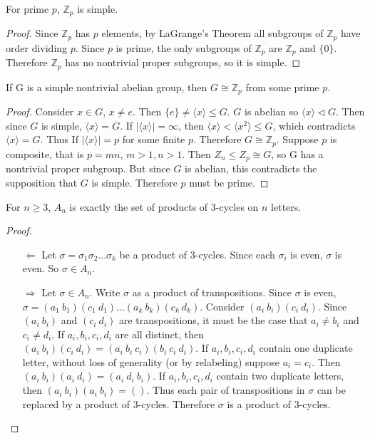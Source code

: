 \documentclass[a4paper]{article}
\begin{document}
\begin{theorem}For prime $p$, $\mathbb{Z}_p$ is simple.
\end{theorem}
\begin{proof}
Since $\mathbb{Z}_p$ has $p$ elements, by LaGrange's Theorem all subgroups of $\mathbb{Z}_p$ have order dividing $p$. Since $p$ is prime, the only subgroups of $\mathbb{Z}_p$ are $\mathbb{Z}_p$ and $\{0\}$. Therefore $\mathbb{Z}_p$ has no nontrivial proper subgroups, so it is simple.
\end{proof}

\begin{theorem}
If G is a simple nontrivial abelian group, then $G \cong \mathbb{Z}_p$ from some prime $p$.
\end{theorem}
\begin{proof}
Consider $x \in G$, $x \neq e$. Then $\{ e \} \neq \langle x \rangle \le G$. $G$ is abelian so $\langle x \rangle \triangleleft G$. Then since $G$ is simple, $\langle x \rangle = G$. If $|\langle x \rangle| = \infty$, then $\langle x \rangle < \langle x^2 \rangle \leq G$, which contradicts $\langle x \rangle = G$. Thus If $|\langle x \rangle| = p$ for some finite $p$. Therefore $G \cong \mathbb{Z}_p$. Suppose $p$ is composite, that is $p = m n$, $m > 1, n > 1$. Then $Z_n \leq Z_p \cong G$, so G has a nontrivial proper subgroup. But since $G$ is abelian, this contradicts the supposition that $G$ is simple. Therefore $p$ must be prime.
\end{proof}

\begin{theorem}
\label{generatethm}
For $n \ge 3$, $A_n$ is exactly the set of products of 3-cycles on $n$ letters.
\end{theorem}
\begin{proof}~
\begin{enumerate}
\item[$\Leftarrow$]
Let $\sigma = \sigma_1 \sigma_2 ... \sigma_k$ be a product of 3-cycles. Since each $\sigma_i$ is even, $\sigma$ is even. So $\sigma \in A_n$.
\item[$\Rightarrow$]
Let $\sigma \in A_n$. Write $\sigma$ as a product of transpositions. Since $\sigma$ is even, $\sigma=(a_1\ b_1)(c_1\ d_1)...(a_k\ b_k)(c_k\ d_k)$. Consider $(a_i\ b_i)(c_i\ d_i)$. Since $(a_i\ b_i)$ and $(c_i\ d_i)$ are transpositions, it must be the case that $a_i \ne b_i$ and $c_i \ne d_i$. If $a_i, b_i, c_i, d_i$ are all distinct, then $(a_i\ b_i)(c_i\ d_i) = (a_i\ b_i\ c_i)(b_i\ c_i\ d_i)$. If $a_i, b_i, c_i, d_i$ contain one duplicate letter, without loss of generality (or by relabeling) suppose $a_i = c_i$. Then $(a_i\ b_i)(a_i\ d_i) = (a_i\ d_i\ b_i)$. If $a_i, b_i, c_i, d_i$ contain two duplicate letters, then $(a_i\ b_i)(a_i\ b_i) = ()$. Thus each pair of transpositions in $\sigma$ can be replaced by a product of 3-cycles. Therefore $\sigma$ is a product of 3-cycles.
\end{enumerate}
\end{proof}
\end{document}

